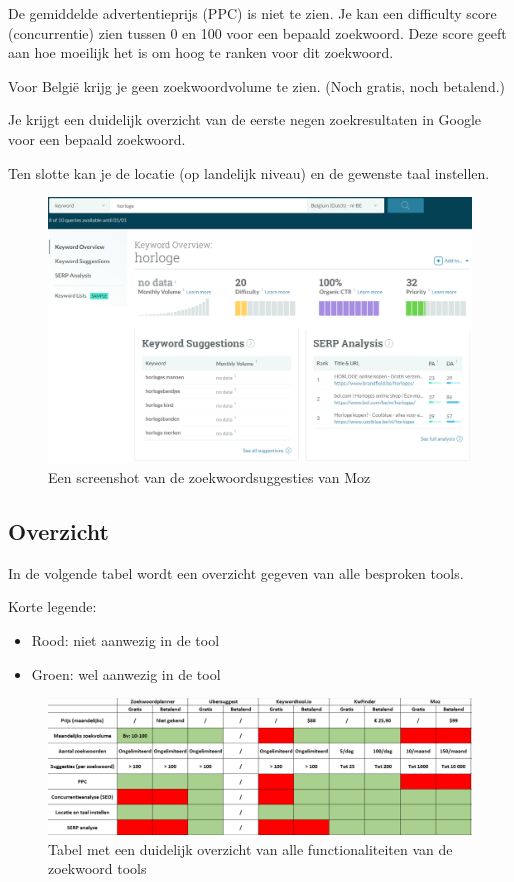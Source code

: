 De gemiddelde advertentieprijs (PPC) is niet te zien. Je kan een difficulty score (concurrentie) zien tussen 0 en 100 voor een bepaald zoekwoord. Deze score geeft aan hoe moeilijk het is om hoog te ranken voor dit zoekwoord. 

Voor België krijg je geen zoekwoordvolume te zien. (Noch gratis, noch betalend.)

Je krijgt een duidelijk overzicht van de eerste negen zoekresultaten in Google voor een bepaald zoekwoord. 

Ten slotte kan je de locatie (op landelijk niveau) en de gewenste taal instellen.

\begin{figure}[h!]
\centering
\includegraphics[width=\linewidth]{img/moz.PNG}
\caption{Een screenshot van de zoekwoordsuggesties van Moz
\autocite{moz}}
\end{figure}

\subsection{Overzicht}
\label{ch: Overzicht}

In de volgende tabel wordt een overzicht gegeven van alle besproken tools. 

Korte legende: 
\begin{itemize}
\item Rood: niet aanwezig in de tool
\item Groen: wel aanwezig in de tool
\end{itemize}

\begin{figure}[h!]
\centering
\includegraphics[width=\linewidth]{img/zoekwoordtabel.PNG}
\caption{Tabel met een duidelijk overzicht van alle functionaliteiten van de zoekwoord tools}
\end{figure}

